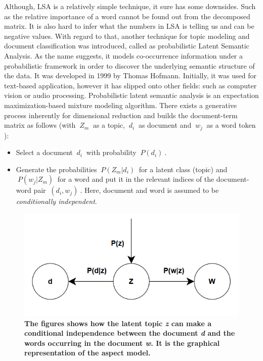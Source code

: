 \documentclass[12pt]{report}
\begin{document}
        Although, LSA is a relatively simple technique, it sure has some downsides. Such as the relative importance of a word cannot be found out from the decomposed matrix.
        It is also hard to infer what the numbers in LSA is telling us and can be negative values. With regard to that, another technique for topic modeling and document classification
        was introduced, called as probabilistic Latent Semantic Analysis. As the name suggests, it models co-occurrence information under a probabilistic framework in order to
        discover the underlying semantic structure of the data. It was developed in 1999 by Thomas Hofmann\cite{hofmann2013probabilistic}. Initially, it was used for text-based
        application, however it has slipped onto other fields: such as computer vision or audio processing.
        Probabilistic latent semantic analysis is an expectation maximization-based mixture modeling algorithm\cite{aggarwal2015data}. There exists a generative process \cite{aggarwal2015data}
        inherently for dimensional reduction and builds the document-term matrix as follows (with $~{Z_m}~$ as a topic, $~{d_i}~$ as document and $~{w_j}~$ as a word token ):
        \begin{itemize}
            \item Select a document $~{d_i}~$ with probability $~{P(d_i)}~$.
            \item Generate the probabilities $~{P(Z_m|d_i)}~$ for a latent class (topic) and $~{P(w_j | Z_m)}~$ for a word and put it in the relevant indices of the document-word pair $~{(d_i, w_j)}~$. Here,
            document and word is assumed to be \emph{conditionally independent}.

        \end{itemize}
        \begin{figure}[h]
            \centering
            \includegraphics[scale=0.5]{graphrep.png}
            \caption{\textbf{The figures shows how the latent topic \emph{z} can make a conditional independence between the
            document \emph{d} and the words occurring in the document \emph{w}. It is the graphical representation of the aspect model.} }
        \end{figure}
\end{document}

